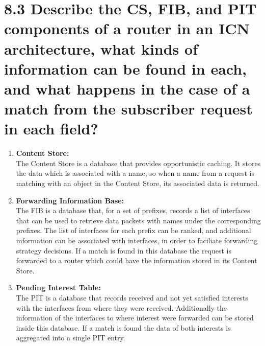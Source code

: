 \documentclass{article}
\begin{document}
	\section*{8.3 Describe the CS, FIB, and PIT components of a router in an ICN architecture, what kinds of information can be found in each, and what happens in the case of a match from the subscriber request in each field?}
	\begin{adjustwidth}{2em}{2em}
		\begin{enumerate}[\small \textbullet]
			\item \textbf{Content Store:} \\
			The Content Store is a database that provides opportunistic caching. It stores the data which is associated with a name, so when a name from a request is matching with an object in the Content Store, its associated data is returned.
			\item \textbf{Forwarding Information Base:} \\
			The FIB is a database that, for a set of prefixes, records a list of interfaces that can be used to retrieve data packets with names under the corresponding prefixes. The list of interfaces for each prefix can be ranked, and additional information can be associated with interfaces, in order to faciliate forwarding strategy decisions. If a match is found in this database the request is forwarded to a router which could have the information stored in its Content Store.
			\item \textbf{Pending Interest Table:} \\
			The PIT is a database that records received and not yet satisfied interests with the interfaces from where they were received. Additionally the information of the interfaces to where interest were forwarded can be stored inside this database. If a match is found the data of both interests is aggregated into a single PIT entry.
		\end{enumerate}
	\end{adjustwidth}
	
\end{document}
